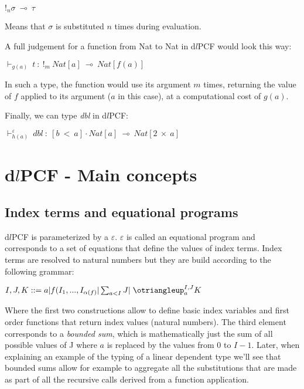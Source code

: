 \documentclass[a4paper,12pt]{article}
\begin{document}
\begin{center}
$!_{n}\sigma~\multimap~\tau$
\end{center} 

Means that $\sigma$ is substituted $n$ times during evaluation. 

\medskip

A full judgement for a function from Nat to
Nat  in d$l$PCF would look this way:

\begin{center}
$\vdash_{g(a)}~t~:~!_{m}~Nat[a]~\multimap~Nat[f(a)]$ 
\end{center}

In such a type, the function would use its argument $m$ times, returning 
the value of $f$ applied to its argument ($a$ in this case), at a computational
cost of $g(a)$. 

Finally, we can type \emph{dbl} in d$l$PCF:

\begin{center}
$\vdash^{\varepsilon}_{h(a)}~dbl~:~[b~<~a] \cdot Nat[a]~\multimap~Nat[2~\times~a]$
\end{center}

\section{d$l$PCF - Main concepts}

\subsection{Index terms and equational programs}

d$l$PCF is parameterized by a $\varepsilon$. $\varepsilon$ is called an equational
program and corresponds to a set of equations that define the values of index 
terms. Index terms are resolved to natural numbers but they are build according to 
the following grammar:

\begin{center}
$I,J,K::= a | f(I_{1},...,I_{\alpha(f)} | \sum_{a<I} J |\;\otriangleup_{a}^{I,J}K $
\end{center}

Where the first two constructions allow to define basic index variables and first order
functions that return index values (natural numbers). The third element corresponds to
a \emph{bounded sum}, which is mathematically just the sum of all possible values of J 
where $a$ is replaced by the values from 0 to $I-1$. Later, when explaining an example 
of the typing of a linear dependent type we'll see that bounded sums allow for example to 
aggregate all the substitutions that are made as part of all the recursive calls derived
from a function application. 
\end{document}
